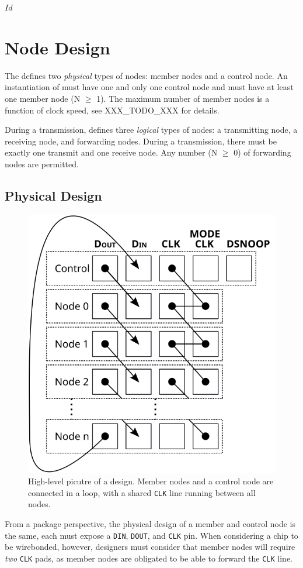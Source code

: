 \svnInfo $Id$

\section{Node Design}
\label{sec:design}
The \bus defines two {\em physical} types of nodes: member nodes and a control
node. An instantiation of \bus must have one and only one control node and
must have at least one member node (N $\geq$ 1). The maximum number of member
nodes is a function of clock speed, see XXX\_TODO\_XXX for details.

During a transmission, \bus defines three {\em logical} types of nodes:
a transmitting node, a receiving node, and forwarding nodes. During a
transmission, there must be exactly one transmit and one receive node. Any
number (N $\geq$ 0) of forwarding nodes are permitted.

\subsection{Physical Design}
\label{sec:physical}

\begin{figure}
\begin{center}
\includegraphics[width=0.5\linewidth]{img/stacked_layers}
\end{center}
\caption{High-level picutre of a \bus design. Member nodes and a control node
are connected in a loop, with a shared {\tt CLK} line running between all
nodes.}
\label{fig:bus}
\end{figure}

From a package perspective, the physical design of a member and control node
is the same, each must expose a {\tt DIN}, {\tt DOUT}, and {\tt CLK} pin. When
considering a chip to be wirebonded, however, designers must consider that
member nodes will require {\em two} {\tt CLK} pads, as member nodes are
obligated to be able to forward the {\tt CLK} line.

